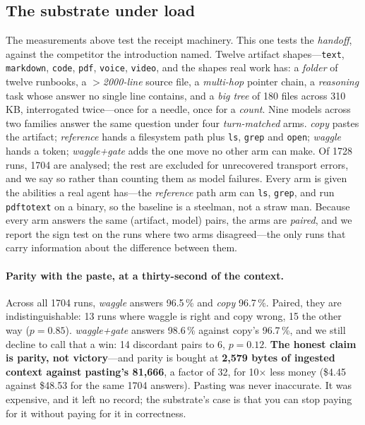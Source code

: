 \documentclass[10pt,twocolumn]{article}
\newcommand{\tok}[1]{\texttt{#1}}
\begin{document}
\subsection{The substrate under load}
\label{sec:tier3}

The measurements above test the receipt machinery. This one tests the
\emph{handoff}, against the competitor the introduction named. Twelve artifact
shapes---\texttt{text}, \texttt{markdown}, \texttt{code}, \texttt{pdf},
\texttt{voice}, \texttt{video}, and the shapes real work has: a \emph{folder} of
twelve runbooks, a \emph{$>$2000-line} source file, a \emph{multi-hop} pointer
chain, a \emph{reasoning} task whose answer no single line contains, and a
\emph{big tree} of 180 files across 310\,KB, interrogated twice---once for a
needle, once for a \emph{count}. Nine models across two families answer the same
question under four \emph{turn-matched} arms. \emph{copy} pastes the artifact;
\emph{reference} hands a filesystem path plus \tok{ls}, \tok{grep} and
\tok{open}; \emph{waggle} hands a token; \emph{waggle+gate} adds the one move no
other arm can make. Of 1728 runs, 1704 are analysed; the rest are excluded for
unrecovered transport errors, and we say so rather than counting them as model
failures. Every arm is given the abilities a real agent has---the \emph{reference}
path arm can \tok{ls}, \tok{grep}, and run \tok{pdftotext} on a binary, so the
baseline is a steelman, not a straw man. Because every arm answers the same
(artifact, model) pairs, the arms are \emph{paired}, and we report the sign test on
the runs where two arms disagreed---the only runs that carry information about the
difference between them.

\paragraph{Parity with the paste, at a thirty-second of the context.} Across all
1704 runs, \emph{waggle} answers 96.5\,\% and \emph{copy} 96.7\,\%. Paired, they
are indistinguishable: 13 runs where waggle is right and copy wrong, 15 the other
way ($p=0.85$). \emph{waggle+gate} answers 98.6\,\% against copy's 96.7\,\%, and we
still decline to call that a win: 14 discordant pairs to 6, $p=0.12$. \textbf{The
honest claim is parity, not victory}---and parity is bought at \textbf{2{,}579 bytes
of ingested context against pasting's 81{,}666}, a factor of 32, for 10$\times$ less
money ({\$}4.45 against {\$}48.53 for the same 1704 answers). Pasting was never
inaccurate. It was expensive, and it left no record; the substrate's case is that
you can stop paying for it without paying for it in correctness.
\end{document}
